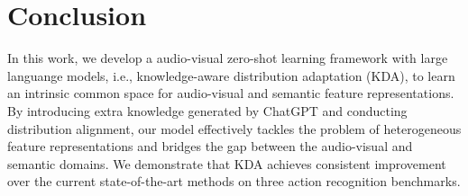 \documentclass[10pt,twocolumn,letterpaper]{article}
\begin{document}
\section{Conclusion}
In this work, we develop a audio-visual zero-shot learning framework with large languange models, i.e., knowledge-aware distribution adaptation (KDA), to learn an intrinsic common space for audio-visual and semantic feature representations. By introducing extra knowledge generated by ChatGPT and conducting distribution alignment, our model effectively tackles the problem of heterogeneous feature representations and bridges the gap between the audio-visual and semantic domains.
We demonstrate that KDA achieves consistent improvement over the current state-of-the-art methods on three action recognition benchmarks. 



{
    \small
    
    
}
\end{document}
